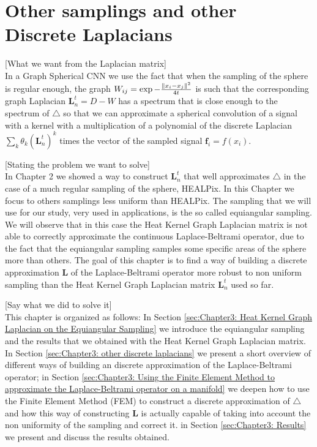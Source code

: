 

\section{Other samplings and other Discrete Laplacians}

[What we want from the Laplacian matrix]\\
In a Graph Spherical CNN we use the fact that when the sampling of the sphere is regular enough, the graph $W_{i j} = \exp {-\frac{\left\lVert x_i-x_j\right\rVert^2}{4t}}$ is such that the corresponding graph Laplacian $\mathbf L_n^t=D-W$ has a spectrum that is close enough to the spectrum of $\triangle$ so that we can approximate a spherical convolution of a signal with a kernel with a multiplication of a polynomial of the discrete Laplacian $\sum_k \theta_k (\mathbf L_n^t)^k$ times the vector of the sampled signal $\mathbf f_i = f(x_i)$. 

[Stating the problem we want to solve]\\
In Chapter 2 we showed a way to construct $\mathbf L_n^t$ that well approximates $\triangle$ in the case of a much regular sampling of the sphere, HEALPix. In this Chapter we focus to others samplings less uniform than HEALPix. The sampling that we will use for our study, very used in applications, is the so called equiangular sampling. We will observe that in this case the Heat Kernel Graph Laplacian matrix is not able to correctly approximate the continuous Laplace-Beltrami operator, due to the fact that the equiangular sampling samples some specific areas of the sphere more than others. The goal of this chapter is to find a way of building a discrete approximation $\mathbf L$ of the Laplace-Beltrami operator more robust to non uniform sampling than the Heat Kernel Graph Laplacian matrix $\mathbf L_n^t$ used so far.

[Say what we did to solve it]\\
This chapter is organized as follows: In Section \ref{sec:Chapter3: Heat Kernel Graph Laplacian on the Equiangular Sampling} we introduce the equiangular sampling and the results that we obtained with the Heat Kernel Graph Laplacian matrix. In Section \ref{sec:Chapter3: other discrete laplacians} we present a short overview of different ways of building an discrete approximation of the Laplace-Beltrami operator; in Section \ref{sec:Chapter3: Using the Finite Element Method to approximate the Laplace-Beltrami operator on a manifold} we deepen how to use the Finite Element Method (FEM) to construct a discrete approximation of $\triangle$ and how this way of constructing $\mathbf L$  is actually capable of taking into account the non uniformity of the sampling and correct it. in Section \ref{sec:Chapter3: Results} we present and discuss the results obtained.
